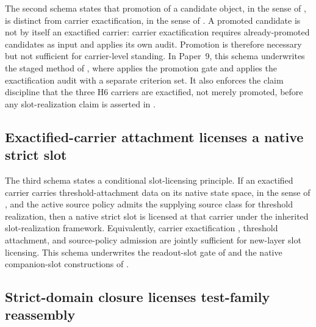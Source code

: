 \documentclass[11pt]{article}
\newcommand{\NewLayer}{H6}
\newcommand{\PaperNine}{Paper~9}
\theoremstyle{definition}
\begin{document}
The second schema states that promotion of a candidate object, in the sense of
\cite{Tsiokos2026PromotionCriteria}, is distinct from carrier exactification, in
the sense of \cite{Tsiokos2026CarrierExactification}.  A promoted candidate is
not by itself an exactified carrier: carrier exactification requires
already-promoted candidates as input and applies its own audit.  Promotion is
therefore necessary but not sufficient for carrier-level standing.  In
\PaperNine{}, this schema underwrites the staged method of ,
where  applies the promotion gate
and  applies the exactification audit with
a separate criterion set.  It also enforces the claim discipline that the three
\NewLayer{} carriers are exactified, not merely promoted, before any
slot-realization claim is asserted in .

\subsection{Exactified-carrier attachment licenses a native strict slot}\label{subsec:schema-attachment-licenses-slot}

The third schema states a conditional slot-licensing principle.  If an
exactified carrier carries threshold-attachment data on its native state space,
in the sense of \cite{Tsiokos2026FoundationsII}, and the active source policy
admits the supplying source class for threshold realization, then a native
strict slot is licensed at that carrier under the inherited slot-realization
framework.  Equivalently, carrier exactification
\cite{Tsiokos2026CarrierExactification}, threshold attachment, and source-policy
admission are jointly sufficient for new-layer slot licensing.  This schema
underwrites the readout-slot gate of
 and the native companion-slot
constructions of
.

\subsection{Strict-domain closure licenses test-family reassembly}\label{subsec:schema-slots-license-tests}
\end{document}
